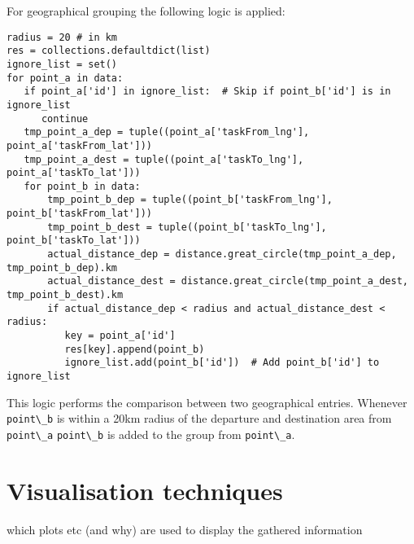 For geographical grouping the following logic is applied:
\begin{lstlisting}
radius = 20 # in km
res = collections.defaultdict(list)
ignore_list = set()
for point_a in data:
   if point_a['id'] in ignore_list:  # Skip if point_b['id'] is in ignore_list
      continue
   tmp_point_a_dep = tuple((point_a['taskFrom_lng'], point_a['taskFrom_lat']))
   tmp_point_a_dest = tuple((point_a['taskTo_lng'], point_a['taskTo_lat']))
   for point_b in data:
	   tmp_point_b_dep = tuple((point_b['taskFrom_lng'], point_b['taskFrom_lat']))
       tmp_point_b_dest = tuple((point_b['taskTo_lng'], point_b['taskTo_lat']))
       actual_distance_dep = distance.great_circle(tmp_point_a_dep, tmp_point_b_dep).km
       actual_distance_dest = distance.great_circle(tmp_point_a_dest, tmp_point_b_dest).km
       if actual_distance_dep < radius and actual_distance_dest < radius:
          key = point_a['id']
          res[key].append(point_b)
          ignore_list.add(point_b['id'])  # Add point_b['id'] to ignore_list
\end{lstlisting}
This logic performs the comparison between two geographical entries. Whenever \verb|point\_b| is within a 20km radius of the departure and destination area from \verb|point\_a| \verb|point\_b| is added to the group from \verb|point\_a|.


\section{Visualisation techniques}
which plots etc (and why) are used to display the gathered information 

